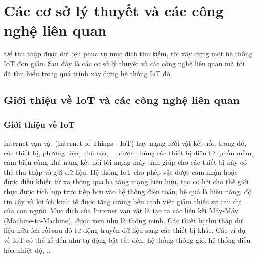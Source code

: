 \chapter{Các cơ sở lý thuyết và các công nghệ liên quan}

Để thu thập được dữ liệu phục vụ mục đích tìm kiếm, tôi xây dựng một hệ thống IoT đơn giản. Sau đây là các cơ sở lý thuyết và các công nghệ liên quan mà tôi đã tìm hiểu trong quá trình xây dựng hệ thống IoT đó.
\section{Giới thiệu về IoT và các công nghệ liên quan}
\subsection{Giới thiệu về IoT}
Internet vạn vật (Internet of Things - IoT) hay mạng lưới vật kết nối, trong đó, các thiết bị, phương tiện, nhà cửa, ... được nhúng các thiết bị điện tử, phần mềm, cảm biến cùng khả năng kết nối tới mạng máy tính giúp cho các thiết bị này có thể thu thập và gửi dữ liệu. Hệ thống IoT cho phép vật được cảm nhận hoặc được điều khiển từ xa thông qua hạ tầng mạng hiện hữu, tạo cơ hội cho thế giới thực được tích hợp trực tiếp hơn vào hệ thống điện toán, hệ quả là hiệu năng, độ tin cậy và lợi ích kinh tế được tăng cường bên cạnh việc giảm thiểu sự can dự của con người. Mục đích của Internet vạn vật là tạo ra các liên kết Máy-Máy (Machine-to-Machine), được xem như là thông minh. Các thiết bị thu thập dữ liệu hữu ích rồi sau đó tự động truyền dữ liệu sang các thiết bị khác. Các ví dụ về IoT có thể kể đến như tự động bật tắt đèn, hệ thống thông gió, hệ thống điều hòa nhiệt độ, ... 


